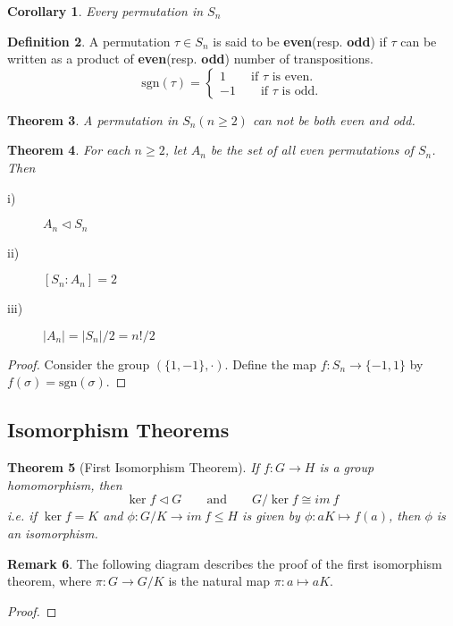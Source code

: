 \documentclass[leqno,DIV=calc,paper=a4,fontsize=11pt]{article}
\newtheorem{thm}{Theorem}[section]
\newtheorem{cor}[thm]{Corollary}
\theoremstyle{definition}
\newtheorem{defn}[thm]{Definition}
\newtheorem{rem}[thm]{Remark}
\theoremstyle{plain}
\theoremstyle{remark}
\begin{document}
\begin{cor}
Every permutation in $S_n$
\end{cor}

\begin{defn}
A permutation $\tau\in S_n$ is said to be \textbf{even}(resp. \textbf{odd}) if $\tau$ can be written as a product of \textbf{even}(resp. \textbf{odd}) number of transpositions.
\[\text{sgn}(\tau)=
\begin{cases}
1 \qquad \text{if } \tau \text{ is even.}\\
-1\qquad \text{if } \tau \text{ is odd.}
\end{cases}
\]
\end{defn}
\begin{thm}
A permutation in $S_n(n\geq2)$ can not be both even and odd.
\end{thm}

\begin{thm}
For each $n\geq2$, let $A_n$ be the set of all even permutations of $S_n$. Then
\begin{description}
  \item[i)] $A_n\lhd S_n$
  \item[ii)] $[S_n:A_n]=2$
  \item[iii)] $|A_n|=|S_n|/2=n!/2$
\end{description}
\end{thm}
\begin{proof}
Consider the group $(\{1,-1\},\cdot)$. Define the map $f:S_n\to \{-1,1\}$ by $f(\sigma)=\text{sgn}(\sigma)$.

\end{proof}
\subsection{Isomorphism Theorems}

\begin{thm}[First Isomorphism Theorem]
If $f:G\to H$ is a group homomorphism, then
$$\ker f\lhd G\qquad\text{and}\qquad G/\ker f \cong im\ f$$
i.e. if $\ker f = K$ and $\phi: G/K \to im\ f \leq H$ is given by $\phi : aK \mapsto f (a)$, then $\phi$ is an isomorphism.
\end{thm}
\begin{rem}
The following diagram describes the proof of the first isomorphism theorem, where $\pi : G \to G/K$ is the natural map $\pi : a \mapsto aK$.

\begin{center}
\end{center}
\end{rem}
\begin{proof}

\end{proof}
\end{document}
